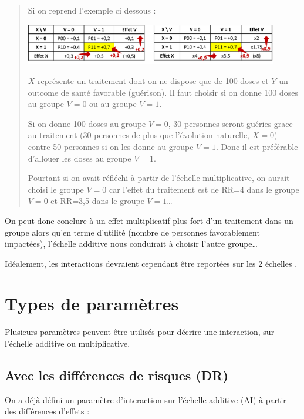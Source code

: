 \documentclass[
]{book}
\begin{document}
\begin{quote}
Si on reprend l'exemple ci dessous :

\includegraphics[width=0.9\textwidth,height=\textheight]{img/Image4.png}

\(X\) représente un traitement dont on ne dispose que de 100 doses et \(Y\) un outcome de santé favorable (guérison).
Il faut choisir si on donne 100 doses au groupe \(V = 0\) ou au groupe \(V = 1\).

Si on donne 100 doses au groupe \(V = 0\), 30 personnes seront guéries grace au traitement (30 personnes de plus que l'évolution naturelle, \(X=0\)) contre 50 personnes si on les donne au groupe \(V = 1\).
Donc il est préférable d'allouer les doses au groupe \(V=1\).

Pourtant si on avait réfléchi à partir de l'échelle multiplicative, on aurait choisi le groupe \(V=0\) car l'effet du traitement est de RR=4 dans le groupe \(V = 0\) et RR=3,5 dans le groupe \(V = 1\)\ldots{}
\end{quote}

On peut donc conclure à un effet multiplicatif plus fort d'un traitement dans un groupe alors qu'en terme d'utilité (nombre de personnes favorablement impactées), l'échelle additive nous conduirait à choisir l'autre groupe\ldots{}

Idéalement, les interactions devraient cependant être reportées sur les 2 échelles \citet{knol_recommendations_2012} \citet{vanderweele_tutorial_2014}.

\hypertarget{param}{%
\chapter{Types de paramètres}\label{param}}

Plusieurs paramètres peuvent être utilisés pour décrire une interaction, sur l'échelle additive ou multiplicative.

\hypertarget{avec-les-diffuxe9rences-de-risques-dr}{%
\section{Avec les différences de risques (DR)}\label{avec-les-diffuxe9rences-de-risques-dr}}

On a déjà défini un paramètre d'interaction sur l'échelle additive (AI) à partir des différences d'effets \citet{vanderweele_tutorial_2014} :
\end{document}
